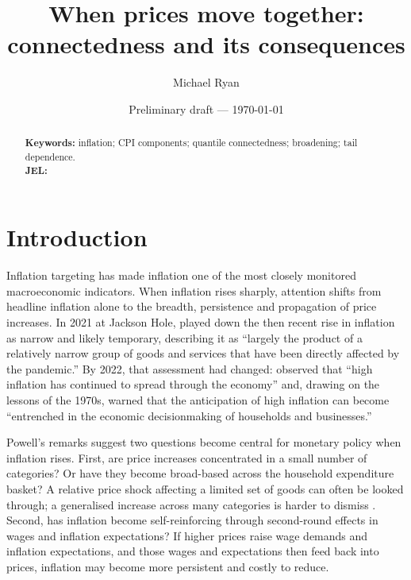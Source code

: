 \documentclass{article}
\title{When prices move together: connectedness and its consequences}
\author[a]{Michael Ryan}
\affil[a]{School of Accounting, Finance and Economics, University of Waikato, Hamilton, New Zealand.
Email: michael.ryan@waikato.ac.nz}
\date{Preliminary draft --- \today}
\begin{document}
\maketitle


\begin{abstract}
 
 
 
\noindent\textbf{Keywords:} inflation; CPI components; quantile connectedness; broadening; tail dependence. \\
\noindent\textbf{JEL:}  
\end{abstract}

\section{Introduction}\label{sec:intro}

Inflation targeting has made inflation one of the most closely monitored
macroeconomic indicators. When inflation rises sharply, attention shifts from
headline inflation alone to the breadth, persistence and propagation of price
increases. In 2021 at Jackson Hole, \citet{Powell2021} played down the then recent rise in
inflation as narrow and likely temporary, describing it as ``largely the product
of a relatively narrow group of goods and services that have been directly
affected by the pandemic.'' By 2022, that assessment had changed:
\citet{Powell2022JH} observed that ``high inflation has continued to spread
through the economy'' and, drawing on the lessons of the 1970s, warned that the
anticipation of high inflation can become ``entrenched in the economic
decisionmaking of households and businesses.'' 

Powell's remarks suggest two questions become central for monetary policy when inflation rises. First, are price
increases concentrated in a small number of categories? Or have they become
broad-based across the household expenditure basket? A relative price shock affecting a
limited set of goods can often be looked through; a generalised increase across
many categories is harder to dismiss \citep{bryan1994measuring}. Second, has
inflation become self-reinforcing through second-round effects in wages and
inflation expectations? If higher prices raise wage demands and inflation
expectations, and those wages and expectations then feed back into prices,
inflation may become more persistent and costly to reduce.
\end{document}
